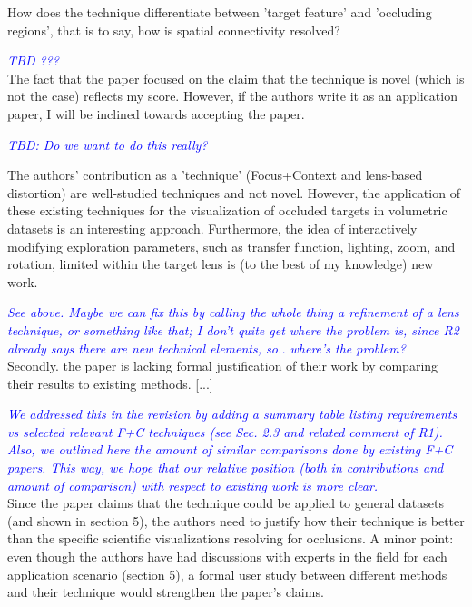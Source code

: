 \documentclass[a4paper,10pt]{article}
\newcommand{\rr}[1]{\emph{\textcolor{blue}{#1}}}
\begin{document}
    How does the technique
    differentiate between 'target feature' and 'occluding regions', that is to say,
    how is spatial connectivity resolved?
    
    \rr{TBD ???}\\

    The fact that the paper focused on the claim that the technique is novel (which is
    not the case) reflects my score. However, if the authors write it as an
    application paper, I will be inclined towards accepting the paper.
    
    \rr{TBD: Do we want to do this really?}

    The authors' contribution as a 'technique' (Focus+Context and lens-based
    distortion) are well-studied techniques and not novel. However, the application of
    these existing techniques for the visualization of occluded targets in volumetric
    datasets is an interesting approach. Furthermore, the idea of interactively
    modifying exploration parameters, such as transfer function, lighting, zoom, and
    rotation, limited within the target lens is (to the best of my knowledge) new
    work.
    
    \rr{See above. Maybe we can fix this by calling the whole thing a refinement of a lens technique, or something like that; I don't quite get where the problem is, since R2 already says there are new technical elements, so.. where's the problem?}\\

    Secondly. the paper is lacking formal justification of their work by comparing
    their results to existing methods. [...]
    
    \rr{We addressed this in the revision by adding a summary table listing requirements \emph{vs} selected relevant F+C techniques (see Sec. 2.3 and related comment of R1). Also, we outlined here the amount of similar comparisons done by existing F+C papers. This way, we hope that our relative position (both in contributions and amount of comparison) with respect to existing work is more clear.}\\
    
    Since the paper claims that the technique could be applied to
    general datasets (and shown in section 5), the authors need to justify how their
    technique is better than the specific scientific visualizations resolving for
    occlusions.
    A minor point: even though the authors have had discussions with experts in the
    field for each application scenario (section 5), a formal user study between
    different methods and their technique would strengthen the paper's claims.
\end{document}
